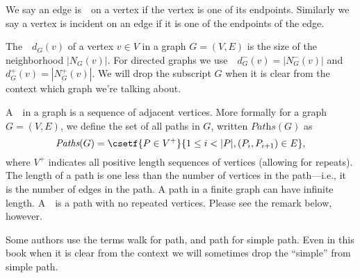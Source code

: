 \begin{cluster}
\label{grp:def:bg::graphs::incidence}

\begin{definition}[Incidence]
\label{def:bg::graphs::incidence}
We say an edge is~~on a vertex if the vertex is one of
its endpoints.  Similarly we say a vertex is incident on an edge if it
is one of the endpoints of the edge.

\end{definition}
\end{cluster}

\begin{cluster}
\label{grp:def:bg::graphs::degree}

\begin{definition}[Degree]
\label{def:bg::graphs::degree}
 The~~$d_G(v)$ of a vertex $v \in V$ in a graph $G =
 (V,E)$ is the size of the neighborhood $|N_G(v)|$.  For directed
 graphs we use~~$d_G^-(v) = |N_G^-(v)|$
 and~~$d_G^+(v) = |N_G^+(v)|$.  We will drop the
 subscript $G$ when it is clear from the context which graph we're
 talking about.

\end{definition}
\end{cluster}

\begin{cluster}
\label{grp:def:bg::graphs::path}

\begin{definition}[Path]
\label{def:bg::graphs::path}
A~~in a graph is a sequence of adjacent vertices.  
More formally for a graph $G = (V,E)$, we define the set of all paths
in $G$, written $\textit{Paths}(G)$ as 
\[
\textit{Paths}(G) = \csetf{P
  \in V^+}{1 \leq i < |P|, (P_i, P_{i+1}) \in E},
\]
where $V^+$ indicates all positive length sequences of vertices
(allowing for repeats).
The length of a path is one less than the number of vertices in the
path---i.e., it is the number of edges in the path.  A path in a
finite graph can have infinite length.  A~~is a path
with no repeated vertices.  Please see the remark below, however.

\end{definition}
\end{cluster}

\begin{cluster}
\label{grp:rmrk:bg::graphs::authors}

\begin{remark}
\label{rmrk:bg::graphs::authors}
Some authors use the terms walk for path, and path for
simple path.   Even in this book when it is clear from the context
we will sometimes drop the ``simple'' from simple path.

\end{remark}
\end{cluster}

